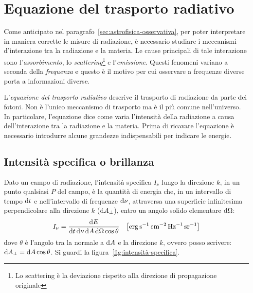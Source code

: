 \section{Equazione del trasporto radiativo}\label{sec:intro-trasporto-radiativo}
Come anticipato nel paragrafo~\ref{sec:astrofisica-osservativa}, per poter interpretare in maniera corrette le misure di radiazione, è necessario studiare i meccanismi d'interazione tra la radiazione e la materia. Le cause principali di tale interazione sono l'\emph{assorbimento}, lo \emph{scattering}\footnote{Lo scattering è la deviazione rispetto alla direzione di propagazione originale} e l'\emph{emissione}. Questi fenomeni variano a seconda della \emph{frequenza} e questo è il motivo per cui osservare a frequenze diverse porta a informazioni diverse.

L'\emph{equazione del trasporto radiativo} descrive il trasporto di radiazione da parte dei fotoni. Non è l'unico meccanismo di trasporto ma è il più comune nell'universo. In particolare, l'equazione dice come varia l'intensità della radiazione a causa dell'interazione tra la radiazione e la materia. Prima di ricavare l'equazione è necessario introdurre alcune grandezze indispensabili per indicare le energie.

\subsection{Intensità specifica o brillanza}\label{sec:intensità}
Dato un campo di radiazione, l'intensità specifica $I_\nu$ lungo la direzione $k$, in un punto qualsiasi $P$ del campo, è la quantità di energia che, in un intervallo di tempo $\ud t$ e nell'intervallo di frequenze $\ud \nu$, attraversa una superficie infinitesima perpendicolare alla direzione $k$ ($\ud A_\perp$), entro un angolo solido elementare $\ud \Omega$:
\begin{equation}\label{eq:intensità}
    I_\nu = \frac{\ud E}{\ud t \ud \nu \ud A \ud \Omega \cos{\theta}} \quad \bigl[\si{erg.s^{-1}.cm^{-2}.Hz^{-1}.sr^{-1}}\bigr]
\end{equation}
dove $\theta$ è l'angolo tra la normale a $\ud A$ e la direzione $k$, ovvero posso scrivere: $\ud A_\perp = \ud A \cos{\theta}$. Si guardi la figura~\ref{fig:intensità-specifica}.

